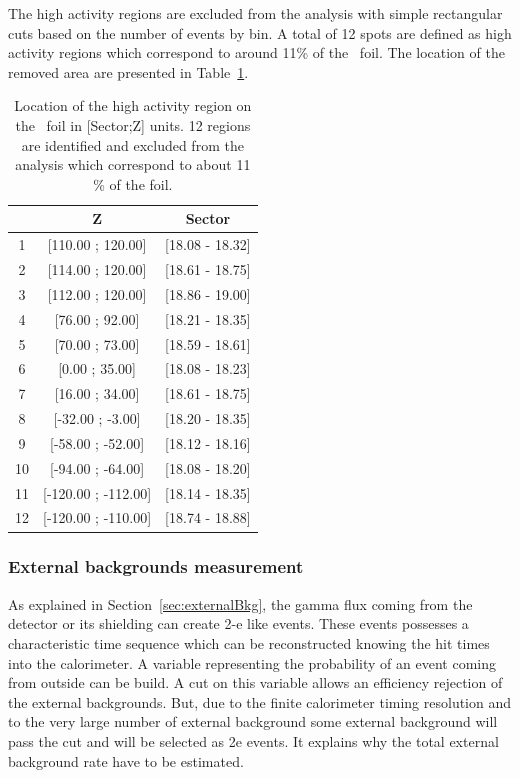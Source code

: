 \documentclass[main.tex]{subfiles}
\begin{document}
\bigskip


\NI The high activity regions are excluded from the analysis with simple rectangular cuts based on the number of events by bin. A total of 12 spots are defined as high activity regions which correspond to around 11\% of the \Cd~foil. The location of the removed area are presented in Table~\ref{Tab:HighActivityRegion}. 


\begin{table}
\centering
\begin{tabular}{c|c|c}
  & Z                 & Sector \\
\midrule
1  & [110.00 ; 120.00]   & [18.08 - 18.32] \\ [0.1cm]
2  & [114.00 ; 120.00]   & [18.61 - 18.75] \\ [0.1cm]
3  & [112.00 ; 120.00]   & [18.86 - 19.00] \\ [0.1cm]
4  & [76.00 ; 92.00]     & [18.21 - 18.35] \\ [0.1cm]
5  & [70.00 ; 73.00]     & [18.59 - 18.61] \\ [0.1cm]
6  & [0.00 ; 35.00]      & [18.08 - 18.23] \\ [0.1cm]
7  & [16.00 ; 34.00]     & [18.61 - 18.75] \\ [0.1cm]
8  & [-32.00 ; -3.00]    & [18.20 - 18.35] \\ [0.1cm]
9  & [-58.00 ; -52.00]   & [18.12 - 18.16] \\ [0.1cm]
10 & [-94.00 ; -64.00]   & [18.08 - 18.20] \\ [0.1cm]
11 & [-120.00 ; -112.00] & [18.14 - 18.35] \\ [0.1cm]
12 & [-120.00 ; -110.00] & [18.74 - 18.88] \\
\bottomrule
\end{tabular}
\caption{Location of the high activity region on the \Cd~foil in [Sector;Z] units. 12 regions are identified and excluded from the analysis which correspond to about 11 \% of the foil.}
\label{Tab:HighActivityRegion}
\end{table}


\FloatBarrier


\subsubsection{External backgrounds measurement} \label{sec:External}


\NI As explained in Section~\ref{sec:externalBkg}, the gamma flux coming from the detector or its shielding can create 2-e like events. These events possesses a characteristic time sequence which can be reconstructed knowing the hit times into the calorimeter. A variable representing the probability of an event coming from outside can be build. A cut on this variable allows an efficiency rejection of the external backgrounds. But, due to the finite calorimeter timing resolution and to the very large number of external background some external background will pass the cut and will be selected as 2e events. It explains why the total external background rate have to be estimated. 
\end{document}
